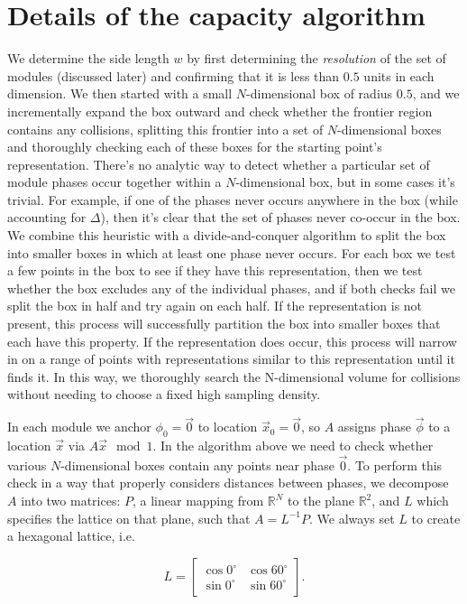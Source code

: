 \documentclass[12pt]{article}
\begin{document}
\section{Details of the capacity algorithm}
\label{sec:algo details}

We determine the side length $w$ by first determining the \textit{resolution} of the set of modules (discussed later) and confirming that it is less than $0.5$ units in each dimension. We then started with a small $N$-dimensional box of radius $0.5$, and we incrementally expand the box outward and check whether the frontier region contains any collisions, splitting this frontier into a set of $N$-dimensional boxes and thoroughly checking each of these boxes for the starting point's representation. There's no analytic way to detect whether a particular set of module phases occur together within a $N$-dimensional box, but in some cases it's trivial. For example, if one of the phases never occurs anywhere in the box (while accounting for $\Delta$), then it's clear that the set of phases never co-occur in the box. We combine this heuristic with a divide-and-conquer algorithm to split the box into smaller boxes in which at least one phase never occurs. For each box we test a few points in the box to see if they have this representation, then we test whether the box excludes any of the individual phases, and if both checks fail we split the box in half and try again on each half. If the representation is not present, this process will successfully partition the box into smaller boxes that each have this property. If the representation does occur, this process will narrow in on a range of points with representations similar to this representation until it finds it. In this way, we thoroughly search the N-dimensional volume for collisions without needing to choose a fixed high sampling density.

In each module we anchor $\phi_0 = \vec{0}$ to location $\vec{x}_0 = \vec{0}$, so $A$ assigns phase $\vec{\phi}$ to a location $\vec{x}$ via $A\vec{x} \mod 1$. In the algorithm above we need to check whether various $N$-dimensional boxes contain any points near phase $\vec{0}$. To perform this check in a way that properly considers distances between phases, we decompose $A$ into two matrices: $P$, a linear mapping from $\mathbb{R}^N$ to the plane $\mathbb{R}^2$, and $L$ which specifies the lattice on that plane, such that $A = L^{-1}P$. We always set $L$ to create a hexagonal lattice, i.e.

\begin{equation}
L =
\begin{bmatrix}
\cos 0^{\circ} & \cos 60^{\circ} \\
\sin 0^{\circ} & \sin 60^{\circ}
\end{bmatrix}.
\end{equation}
\end{document}
